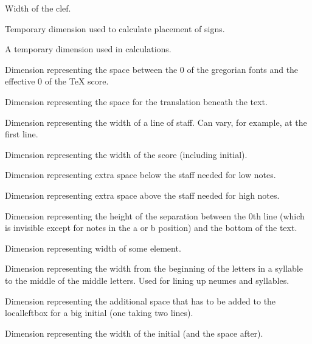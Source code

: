 Width of the clef.

Temporary dimension used to calculate placement of signs.

A temporary dimension used in calculations.

Dimension representing the space between the 0 of the gregorian fonts and the effective 0 of the TeX score.

Dimension representing the space for the translation beneath the text.

Dimension representing the width of a line of staff.  Can vary, for
example, at the first line.

Dimension representing the width of the score (including initial).

Dimension representing extra space below the staff needed for low notes.

Dimension representing extra space above the staff needed for high notes.

Dimension representing the height of the separation between the 0th
line (which is invisible except for notes in the a or b position) and
the bottom of the text.

Dimension representing width of some element.

Dimension representing the width from the beginning of the letters in
a syllable to the middle of the middle letters.  Used for lining up
neumes and syllables.

Dimension representing the additional space that has to be added to
the localleftbox for a big initial (one taking two lines).

Dimension representing the width of the initial (and the space after).

